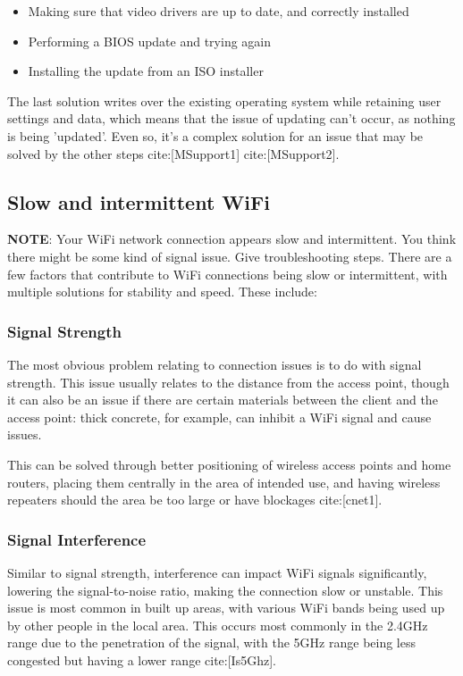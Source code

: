 \documentclass[11pt]{amsart}
\newcommand{\admonition}[2]{\textbf{#1}: {#2}}
\begin{document}
\begin{itemize}

\item Making sure that video drivers are up to date, and correctly installed

\item Performing a BIOS update and trying again

\item Installing the update from an ISO installer

\end{itemize}


The last solution writes over the existing operating system while retaining user settings and data, which means that the issue of updating can’t occur, as nothing is being 'updated'. Even so, it’s a complex solution for an issue that may be solved by the other steps cite:[MSupport1] cite:[MSupport2].


\hypertarget{x-slow-and-intermittent-wifi}{\subsection*{Slow and intermittent WiFi}}
\admonition{NOTE}{Your WiFi network connection appears slow and intermittent. You think there might be some kind of signal issue. Give troubleshooting steps.}
There are a few factors that contribute to WiFi connections being slow or intermittent, with multiple solutions for stability and speed. These include:


\hypertarget{x-signal-strength}{\subsubsection*{Signal Strength}}
The most obvious problem relating to connection issues is to do with signal strength. This issue usually relates to the distance from the access point, though it can also be an issue if there are certain materials between the client and the access point: thick concrete, for example, can inhibit a WiFi signal and cause issues.


This can be solved through better positioning of wireless access points and home routers, placing them centrally in the area of intended use, and having wireless repeaters should the area be too large or have blockages cite:[cnet1].


\hypertarget{x-signal-interference}{\subsubsection*{Signal Interference}}
Similar to signal strength, interference can impact WiFi signals significantly, lowering the signal-to-noise ratio, making the connection slow or unstable. This issue is most common in built up areas, with various WiFi bands being used up by other people in the local area. This occurs most commonly in the 2.4GHz range due to the penetration of the signal, with the 5GHz range being less congested but having a lower range cite:[Is5Ghz].
\end{document}
